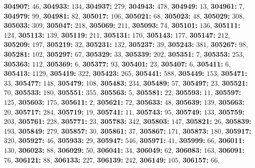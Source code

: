 \textsf{\bfseries 304907:} $46$, \textsf{\bfseries 304933:} $134$, \textsf{\bfseries 304937:} $279$, \textsf{\bfseries 304943:} $478$, \textsf{\bfseries 304949:} $13$, \textsf{\bfseries 304961:} $7$, \textsf{\bfseries 304979:} $99$, \textsf{\bfseries 304981:} $82$, \textsf{\bfseries 305017:} $106$, \textsf{\bfseries 305021:} $68$, \textsf{\bfseries 305023:} $48$, \textsf{\bfseries 305029:} $308$, \textsf{\bfseries 305033:} $309$, \textsf{\bfseries 305047:} $218$, \textsf{\bfseries 305069:} $211$, \textsf{\bfseries 305093:} $74$, \textsf{\bfseries 305101:} $136$, \textsf{\bfseries 305111:} $124$, \textsf{\bfseries 305113:} $139$, \textsf{\bfseries 305119:} $211$, \textsf{\bfseries 305131:} $170$, \textsf{\bfseries 305143:} $177$, \textsf{\bfseries 305147:} $212$, \textsf{\bfseries 305209:} $197$, \textsf{\bfseries 305219:} $32$, \textsf{\bfseries 305231:} $132$, \textsf{\bfseries 305237:} $39$, \textsf{\bfseries 305243:} $381$, \textsf{\bfseries 305267:} $98$, \textsf{\bfseries 305281:} $102$, \textsf{\bfseries 305297:} $67$, \textsf{\bfseries 305329:} $33$, \textsf{\bfseries 305339:} $202$, \textsf{\bfseries 305351:} $7$, \textsf{\bfseries 305353:} $253$, \textsf{\bfseries 305363:} $112$, \textsf{\bfseries 305369:} $6$, \textsf{\bfseries 305377:} $93$, \textsf{\bfseries 305401:} $23$, \textsf{\bfseries 305407:} $6$, \textsf{\bfseries 305411:} $6$, \textsf{\bfseries 305413:} $1129$, \textsf{\bfseries 305419:} $322$, \textsf{\bfseries 305423:} $265$, \textsf{\bfseries 305441:} $588$, \textsf{\bfseries 305449:} $153$, \textsf{\bfseries 305471:} $33$, \textsf{\bfseries 305477:} $148$, \textsf{\bfseries 305479:} $108$, \textsf{\bfseries 305483:} $234$, \textsf{\bfseries 305489:} $57$, \textsf{\bfseries 305497:} $23$, \textsf{\bfseries 305521:} $70$, \textsf{\bfseries 305533:} $180$, \textsf{\bfseries 305551:} $355$, \textsf{\bfseries 305563:} $5$, \textsf{\bfseries 305581:} $22$, \textsf{\bfseries 305593:} $11$, \textsf{\bfseries 305597:} $125$, \textsf{\bfseries 305603:} $175$, \textsf{\bfseries 305611:} $2$, \textsf{\bfseries 305621:} $72$, \textsf{\bfseries 305633:} $48$, \textsf{\bfseries 305639:} $139$, \textsf{\bfseries 305663:} $20$, \textsf{\bfseries 305717:} $284$, \textsf{\bfseries 305719:} $19$, \textsf{\bfseries 305741:} $11$, \textsf{\bfseries 305743:} $95$, \textsf{\bfseries 305749:} $133$, \textsf{\bfseries 305759:} $203$, \textsf{\bfseries 305761:} $228$, \textsf{\bfseries 305771:} $23$, \textsf{\bfseries 305783:} $342$, \textsf{\bfseries 305803:} $147$, \textsf{\bfseries 305821:} $26$, \textsf{\bfseries 305839:} $193$, \textsf{\bfseries 305849:} $279$, \textsf{\bfseries 305857:} $30$, \textsf{\bfseries 305861:} $37$, \textsf{\bfseries 305867:} $171$, \textsf{\bfseries 305873:} $180$, \textsf{\bfseries 305917:} $320$, \textsf{\bfseries 305927:} $46$, \textsf{\bfseries 305933:} $29$, \textsf{\bfseries 305947:} $546$, \textsf{\bfseries 305971:} $41$, \textsf{\bfseries 305999:} $66$, \textsf{\bfseries 306011:} $130$, \textsf{\bfseries 306023:} $88$, \textsf{\bfseries 306029:} $50$, \textsf{\bfseries 306041:} $34$, \textsf{\bfseries 306049:} $62$, \textsf{\bfseries 306083:} $163$, \textsf{\bfseries 306091:} $76$, \textsf{\bfseries 306121:} $88$, \textsf{\bfseries 306133:} $227$, \textsf{\bfseries 306139:} $242$, \textsf{\bfseries 306149:} $105$, \textsf{\bfseries 306157:} $66$, 
